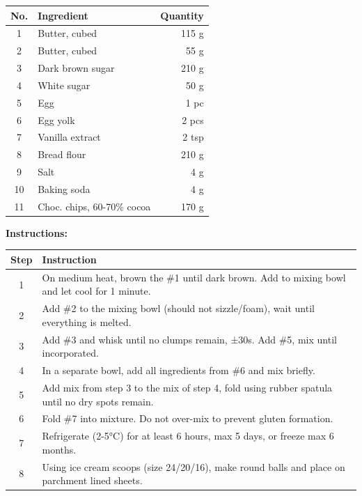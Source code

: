 \begin{center}
\begin{tabular}{|c|l|r|}
    \hline
    \textbf{No.} & \textbf{Ingredient} & \textbf{Quantity} \\
    \hline
    1 & Butter, cubed & 115 g \\
    \hline
    2 & Butter, cubed & 55 g \\
    \hline
    3 & Dark brown sugar & 210 g \\
    \hline
    4 & White sugar & 50 g\\
    \hline
    5 & Egg & 1 pc \\
    \hline
    6 & Egg yolk & 2 pcs \\
    \hline
    7 & Vanilla extract & 2 tsp \\
    \hline
    8 & Bread flour & 210 g \\
    \hline
    9 & Salt & 4 g \\
    \hline
    10 & Baking soda  & 4 g \\
    \hline
    11 & Choc. chips, 60-70\% cocoa & 170 g\\
    \hline
\end{tabular}
\end{center}

\noindent\textbf{Instructions:}
\begin{center}
\begin{tabular}{|c|p{12cm}|}
    \hline
    \textbf{Step} & \textbf{Instruction} \\
    \hline
    1 & On medium heat, brown the \#1 until dark brown. Add to mixing bowl and let cool for 1 minute. \\
    \hline
    2 & Add \#2 to the mixing bowl (should not sizzle/foam), wait until everything is melted. \\
    \hline
    3 & Add \#3 and whisk until no clumps remain, ±30s. Add \#5, mix until incorporated. \\
    \hline
    4 & In a separate bowl, add all ingredients from \#6 and mix briefly. \\
    \hline
    5 & Add mix from step 3 to the mix of step 4, fold using rubber spatula until no dry spots remain. \\
    \hline
    6 & Fold \#7 into mixture. Do not over-mix to prevent gluten formation. \\
    \hline
    7 & Refrigerate (2-5°C) for at least 6 hours, max 5 days, or freeze max 6 months. \\
    \hline
    8 & Using ice cream scoops (size 24/20/16), make round balls and place on parchment lined sheets. \\
    \hline
\end{tabular}
\end{center}

